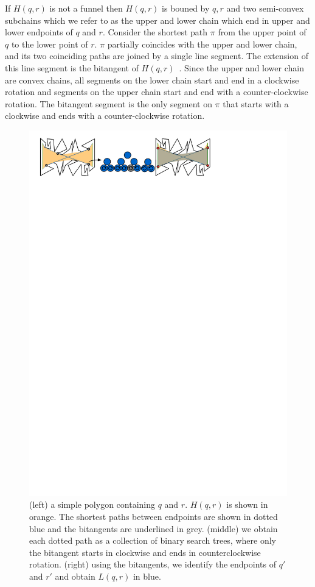 \documentclass[a4paper, UKenglish]{lipics-v2018}
\begin{document}
If $H(q,r)$ is not a funnel then $H(q,r)$ is bouned by $q, r$ and two semi-convex subchains which we refer to as the upper and lower chain which end in upper and lower endpoints of $q$ and $r$. Consider the shortest path $\pi$ from the upper point of $q$ to the lower point of $r$. $\pi$ partially coincides with the upper and lower chain, and its two coinciding paths are joined by a single line segment. The extension of this line segment is the bitangent of $H(q,r)$~\cite{FRANK}. Since the upper and lower chain are convex chains, all segments on the lower chain start and end in a clockwise rotation and segments on the upper chain start and end with a counter-clockwise rotation. The bitangent segment is the only segment on $\pi$ that starts with a clockwise and ends with a counter-clockwise rotation. 


\begin{figure}[h]
    \centering
    \includegraphics[]{../visibilityglass}
    \caption{(left) a simple polygon containing $q$ and $r$. $H(q,r)$ is shown in orange. The shortest paths between endpoints are shown in dotted blue and the bitangents are underlined in grey. (middle) we obtain each dotted path as a collection of binary search trees, where only the bitangent starts in clockwise and ends in counterclockwise rotation. (right) using the bitangents, we identify the endpoints of $q'$ and $r'$ and obtain $L(q,r)$ in blue. }
    \label{fig:visibilityglass}
\end{figure}
\end{document}
